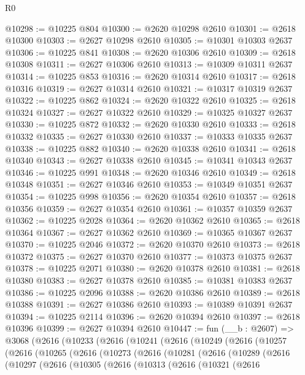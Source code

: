\begin{lexlean}{R0}
\begin{coremodule}
@10298 := @10225 @804
@10300 := @2620 @10298 @2610
@10301 := @2618 @10300
@10303 := @2627 @10298 @2610
@10305 := @10301 @10303 @2637
@10306 := @10225 @841
@10308 := @2620 @10306 @2610
@10309 := @2618 @10308
@10311 := @2627 @10306 @2610
@10313 := @10309 @10311 @2637
@10314 := @10225 @853
@10316 := @2620 @10314 @2610
@10317 := @2618 @10316
@10319 := @2627 @10314 @2610
@10321 := @10317 @10319 @2637
@10322 := @10225 @862
@10324 := @2620 @10322 @2610
@10325 := @2618 @10324
@10327 := @2627 @10322 @2610
@10329 := @10325 @10327 @2637
@10330 := @10225 @872
@10332 := @2620 @10330 @2610
@10333 := @2618 @10332
@10335 := @2627 @10330 @2610
@10337 := @10333 @10335 @2637
@10338 := @10225 @882
@10340 := @2620 @10338 @2610
@10341 := @2618 @10340
@10343 := @2627 @10338 @2610
@10345 := @10341 @10343 @2637
@10346 := @10225 @991
@10348 := @2620 @10346 @2610
@10349 := @2618 @10348
@10351 := @2627 @10346 @2610
@10353 := @10349 @10351 @2637
@10354 := @10225 @998
@10356 := @2620 @10354 @2610
@10357 := @2618 @10356
@10359 := @2627 @10354 @2610
@10361 := @10357 @10359 @2637
@10362 := @10225 @2028
@10364 := @2620 @10362 @2610
@10365 := @2618 @10364
@10367 := @2627 @10362 @2610
@10369 := @10365 @10367 @2637
@10370 := @10225 @2046
@10372 := @2620 @10370 @2610
@10373 := @2618 @10372
@10375 := @2627 @10370 @2610
@10377 := @10373 @10375 @2637
@10378 := @10225 @2071
@10380 := @2620 @10378 @2610
@10381 := @2618 @10380
@10383 := @2627 @10378 @2610
@10385 := @10381 @10383 @2637
@10386 := @10225 @2096
@10388 := @2620 @10386 @2610
@10389 := @2618 @10388
@10391 := @2627 @10386 @2610
@10393 := @10389 @10391 @2637
@10394 := @10225 @2114
@10396 := @2620 @10394 @2610
@10397 := @2618 @10396
@10399 := @2627 @10394 @2610
@10447 := fun (__b : @2607) =>
  @3068
    (@2616
      (@10233
        (@2616
          (@10241
            (@2616
              (@10249
                (@2616
                  (@10257
                    (@2616
                      (@10265
                        (@2616
                          (@10273
                            (@2616
                              (@10281
                                (@2616
                                  (@10289
                                    (@2616
                                      (@10297
                                        (@2616
                                          (@10305
                                            (@2616
                                              (@10313
                                                (@2616
                                                  (@10321
                                                    (@2616

\end{coremodule}
\end{lexlean}
